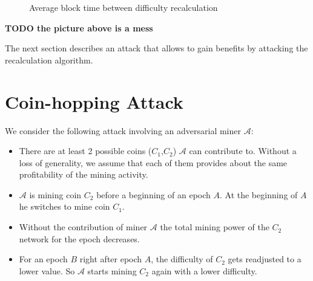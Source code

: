 \documentclass[]{llncs}
\newcommand{\AttackName}{Coin-hopping Attack}
\newcommand{\coinA}{$C_1$}
\newcommand{\coinB}{$C_2$}
\begin{document}
\begin{figure}[H]
\caption{Average block time between difficulty recalculation}
\label{fig:image}
\end{figure}

\textbf{TODO the picture above is a mess}

The next section describes an attack that allows to gain benefits by attacking the recalculation algorithm.
\section{\AttackName}
\label{sec:attack}

We consider the following attack involving an adversarial miner $\mathcal{A}$:

\begin{itemize}
\item There are at least 2 possible coins (\coinA{},\coinB{}) $\mathcal{A}$ can contribute to. Without a loss of generality, we assume that each of them provides about the same profitability of the mining activity.
\item $\mathcal{A}$ is mining coin \coinB{} before a beginning of an epoch $A$. At the beginning of $A$ he switches to mine coin \coinA{}.
\item Without the contribution of miner $\mathcal{A}$ the total mining power of the \coinB{} network for the epoch decreases.
\item For an epoch $B$ right after epoch $A$, the difficulty of \coinB{} gets readjusted to a lower value. So $\mathcal{A}$ starts mining \coinB{} again with a lower difficulty.
\end{itemize}
\end{document}
